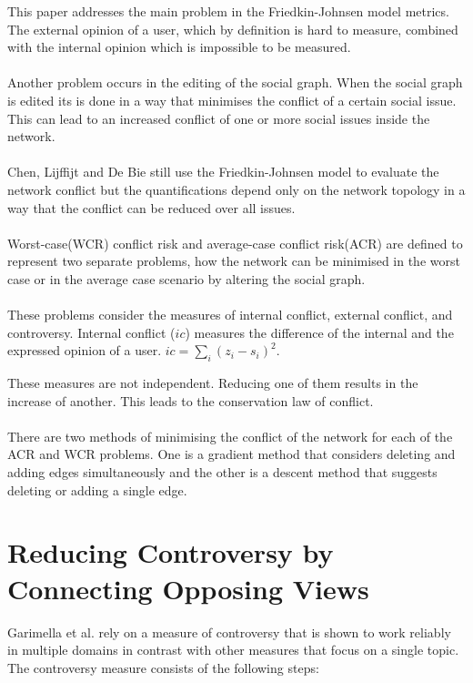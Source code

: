This paper addresses the main problem in the Friedkin-Johnsen model metrics. The external opinion of a user, which by definition is hard to measure, combined with the internal opinion which is impossible to be measured. 
\\
\\
Another problem occurs in the editing of the social graph. When the social graph is edited its is done in a way that minimises the conflict of a certain social issue. This can lead to an increased conflict of one or more social issues inside the network.
\\
\\
Chen, Lijffijt and De Bie still use the Friedkin-Johnsen model to evaluate the network conflict but the quantifications depend only on the network topology in a way that the conflict can be reduced over all issues. 
\\
\\
Worst-case(WCR) conflict risk and average-case conflict risk(ACR) are defined to represent two separate problems, how the network can be minimised in the worst case or in the average case scenario by altering the social graph. 
\\
\\
 These problems consider the measures of internal conflict, external conflict, and controversy. Internal conflict ($ic$) measures the difference of the internal and the expressed opinion of a user. $ic = \sum_i{(z_i-s_i)^2}.$
 \clearpage
 
\noindent These measures are not independent. Reducing one of them results in the increase of another. This leads to the conservation law of conflict.
 \\
 \\
There are two methods of minimising the conflict of the network for each of the ACR and WCR problems. One is a gradient method that  considers deleting and adding edges simultaneously and the other is a descent method that suggests deleting or adding a single edge. \cite{chen}


\section{Reducing Controversy by Connecting Opposing Views}
\label{sec:reducing}

Garimella et al. rely on a measure of controversy that is shown to work reliably in multiple domains in contrast with other measures that focus on a single topic. The controversy measure consists of the following steps:

